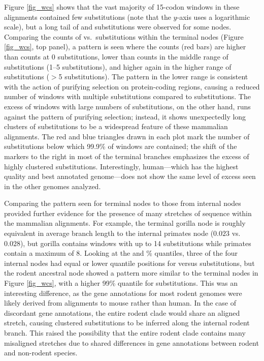 Figure \ref{fig_wcs} shows that the vast majority of 15-codon windows
in these alignments contained few substitutions (note that the
$y$-axis uses a logarithmic scale), but a long tail of \nsyn and \syn
substitutions were observed for some nodes. Comparing the counts of
\nsyn vs.\ \syn substitutions within the terminal nodes (Figure
\ref{fig_wcs}, top panel), a pattern is seen where the \nsyn counts
(red bars) are higher than \syn counts at 0 substitutions, lower than
\syn counts in the middle range of substitutions (1--5 substitutions),
and higher again in the higher range of substitutions ($>$5
substitutions). The pattern in the lower range is consistent with the
action of purifying selection on protein-coding regions, causing a
reduced number of windows with multiple \nsyn substitutions compared
to \syn substitutions. The excess of windows with large numbers of
\nsyn substitutions, on the other hand, runs against the pattern of
purifying selection; instead, it shows unexpectedly long clusters of
\nsyn substitutions to be a widespread feature of these mammalian
alignments. The red and blue triangles drawn in each plot mark the
number of substitutions below which 99.9\% of windows are contained;
the shift of the \nsyn markers to the right in most of the terminal
branches emphasizes the excess of highly clustered \nsyn
substitutions. Interestingly, human---which has the highest quality
and best annotated genome---does not show the same level of excess
seen in the other genomes analyzed.

Comparing the pattern seen for terminal nodes to those from internal
nodes provided further evidence for the presence of many stretches of
\nhom sequence within the mammalian alignments. For example, the
terminal gorilla node is roughly equivalent in average branch length
to the internal primates node ($0.023$ vs.\ $0.028$), but gorilla
contains windows with up to 14 \nsyn substitutions while primates
contain a maximum of 8. Looking at the \nsyn and \%
quantiles, three of the four internal nodes had equal or lower
quantile positions for \nsyn versus \syn substitutions, but the rodent
ancestral node showed a pattern more similar to the terminal nodes in
Figure \ref{fig_wcs}, with a higher 99\% quantile for \nsyn
substitutions. This was an interesting difference, as the gene
annotations for most rodent genomes were likely derived from
alignments to mouse rather than human. In the case of discordant gene
annotations, the entire rodent clade would share an aligned \nhom
stretch, causing clustered substitutions to be inferred along the
internal rodent branch. This raised the possibility that the entire
rodent clade contains many misaligned \nhom stretches due to shared
differences in gene annotations between rodent and non-rodent species.


